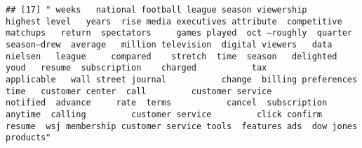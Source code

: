\documentclass[
]{article}
\begin{document}
\begin{verbatim}
## [17] " weeks   national football league season viewership    highest level   years  rise media executives attribute  competitive matchups   return  spectators     games played  oct —roughly  quarter   season—drew  average   million television  digital viewers   data  nielsen   league     compared    stretch  time  season   delighted  youd   resume  subscription    charged           tax          applicable   wall street journal           change  billing preferences   time   customer center  call         customer service            notified  advance     rate  terms           cancel  subscription  anytime  calling         customer service         click confirm  resume  wsj membership customer service tools  features ads  dow jones products"                                                                                                                                                                                                                                                                                                                                                                                                                                                                                                                                                                                                                                                                                                                                                                                                                                                                                                                                                                                                                                                                                                                                                                                                                                                                                                                                                                                                                                                                                                                                                                                                                                                                                                                                                                                                                                                                                                                                                                                                                                                                                                                                                                                                                                                                                                                                                                                                                                                                                                                                                                                                                                                                         
\end{verbatim}
\end{document}
